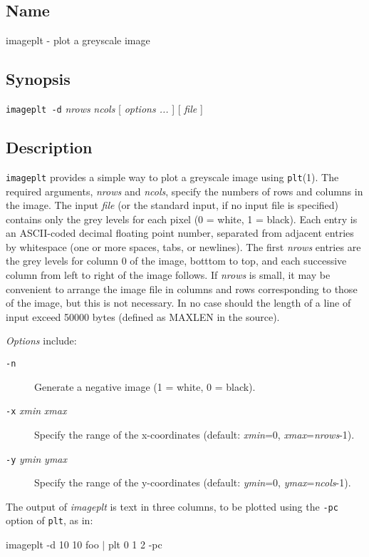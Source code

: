 \subsection*{Name}
imageplt - plot a greyscale image 
\subsection*{Synopsis}
\texttt{imageplt -d} \textit{nrows} \textit{ncols} [ \textit{options
...} ] [ \textit{file} ] 
\subsection*{Description}


\texttt{imageplt} provides a simple way to plot a greyscale
image using \textsf{\texttt{plt}(1)}.  The required arguments, \textit{nrows} and \textit{ncols}, specify the
numbers of rows and columns in the image.  The input \textit{file} (or the standard
input, if no input file is specified) contains only the grey levels for
each pixel (0 = white, 1 = black).  Each entry is an ASCII-coded decimal
floating point number, separated from adjacent entries by whitespace (one
or more spaces, tabs, or newlines).  The first \textit{nrows} entries are the grey
levels for column 0 of the image, botttom to top, and each successive column
from left to right of the image follows.  If \textit{nrows} is small, it may be convenient
to arrange the image file in columns and rows corresponding to those of
the image, but this is not necessary.  In no case should the length of a
line of input exceed 50000 bytes (defined as MAXLEN in the source). 

\textit{Options}
include: \begin{description}
\item [\texttt{-n} ] Generate a negative image (1 = white, 0 = black). 
\item [\texttt{-x} \textit{xmin} \textit{xmax}
] Specify the range of the x-coordinates (default: \textit{xmin}=0, \textit{xmax}=\textit{nrows}-1). 
\item [\texttt{-y}
\textit{ymin} \textit{ymax} ] Specify the range of the y-coordinates (default: \textit{ymin}=0, \textit{ymax}=\textit{ncols}-1).

\end{description}


The output of \textit{imageplt} is text in three columns, to be plotted using the
\texttt{-pc} option of \texttt{plt}, as in: \begin{description}
\item [imageplt -d 10 10 foo $|$ plt 0 1 2 -pc ] 
\end{description}

